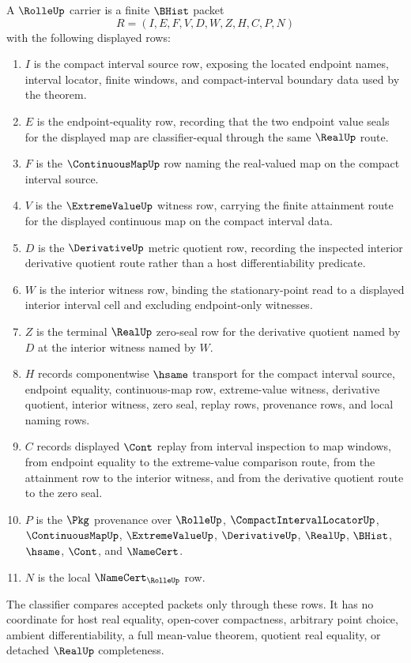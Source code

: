 \begin{definition}
\label{def:rolle-carrier}
A $\RolleUp$ carrier is a finite $\BHist$ packet
$$
R=(I,E,F,V,D,W,Z,H,C,P,N)
$$
with the following displayed rows:
\begin{enumerate}
\item $I$ is the compact interval source row, exposing the located endpoint names, interval locator, finite windows, and compact-interval boundary data used by the theorem.
\item $E$ is the endpoint-equality row, recording that the two endpoint value seals for the displayed map are classifier-equal through the same $\RealUp$ route.
\item $F$ is the $\ContinuousMapUp$ row naming the real-valued map on the compact interval source.
\item $V$ is the $\ExtremeValueUp$ witness row, carrying the finite attainment route for the displayed continuous map on the compact interval data.
\item $D$ is the $\DerivativeUp$ metric quotient row, recording the inspected interior derivative quotient route rather than a host differentiability predicate.
\item $W$ is the interior witness row, binding the stationary-point read to a displayed interior interval cell and excluding endpoint-only witnesses.
\item $Z$ is the terminal $\RealUp$ zero-seal row for the derivative quotient named by $D$ at the interior witness named by $W$.
\item $H$ records componentwise $\hsame$ transport for the compact interval source, endpoint equality, continuous-map row, extreme-value witness, derivative quotient, interior witness, zero seal, replay rows, provenance rows, and local naming rows.
\item $C$ records displayed $\Cont$ replay from interval inspection to map windows, from endpoint equality to the extreme-value comparison route, from the attainment row to the interior witness, and from the derivative quotient route to the zero seal.
\item $P$ is the $\Pkg$ provenance over $\RolleUp$, $\CompactIntervalLocatorUp$, $\ContinuousMapUp$, $\ExtremeValueUp$, $\DerivativeUp$, $\RealUp$, $\BHist$, $\hsame$, $\Cont$, and $\NameCert$.
\item $N$ is the local $\NameCert_{\RolleUp}$ row.
\end{enumerate}
The classifier compares accepted packets only through these rows. It has no coordinate for host real equality, open-cover compactness, arbitrary point choice, ambient differentiability, a full mean-value theorem, quotient real equality, or detached $\RealUp$ completeness.
\end{definition}

